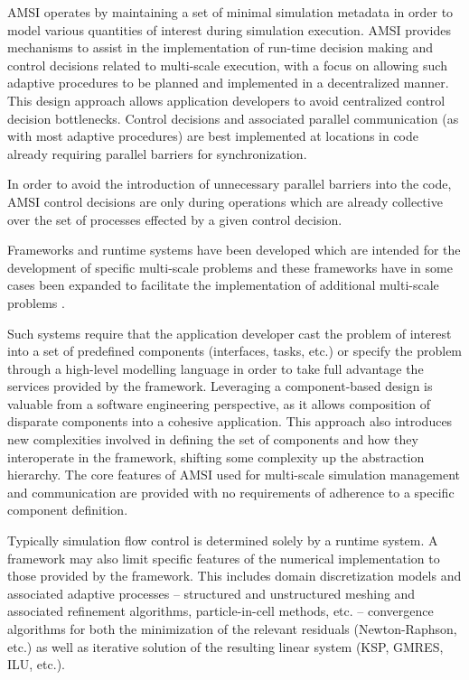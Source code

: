 \documentclass[11pt]{article}
\begin{document}
AMSI operates by maintaining a set of minimal simulation metadata in order to model various quantities of interest during simulation execution. 
AMSI provides mechanisms to assist in the implementation of run-time decision making and control decisions related to multi-scale execution, with a focus on allowing such adaptive procedures to be planned and implemented in a decentralized manner.
This design approach allows application developers to avoid centralized control decision bottlenecks.
Control decisions and associated parallel communication (as with most adaptive procedures) are best implemented at locations in code already requiring parallel barriers for synchronization.

In order to avoid the introduction of unnecessary parallel barriers into the code, AMSI control decisions are only  during operations which are already collective over the set of processes effected by a given control decision.

Frameworks and runtime systems have been developed which are intended for the development of specific multi-scale problems \cite{parker2006component} \cite{chopard2011framework} \cite{} and these frameworks have in some cases been expanded to facilitate the implementation of additional multi-scale problems \cite{berzins2010uintah}.

Such systems require that the application developer cast the problem of interest into a set of predefined components (interfaces, tasks, etc.) or specify the problem through a high-level modelling language in order to take full advantage the services provided by the framework. 
Leveraging a component-based design is valuable from a software engineering perspective, as it allows composition of disparate components into a cohesive application. 
This approach also introduces new complexities involved in defining the set of components and how they interoperate in the framework, shifting some complexity up the abstraction hierarchy.
The core features of AMSI used for multi-scale simulation management and communication are provided with no requirements of adherence to a specific component definition.

Typically simulation flow control is determined solely by a runtime system. 
A framework may also limit specific features of the numerical implementation to those provided by the framework. 
This includes domain discretization models and associated adaptive processes -- structured and unstructured meshing and associated refinement algorithms, particle-in-cell methods, etc. -- convergence algorithms for both the minimization of the relevant residuals (Newton-Raphson, etc.) as well as iterative solution of the resulting linear system (KSP, GMRES, ILU, etc.).
\end{document}
